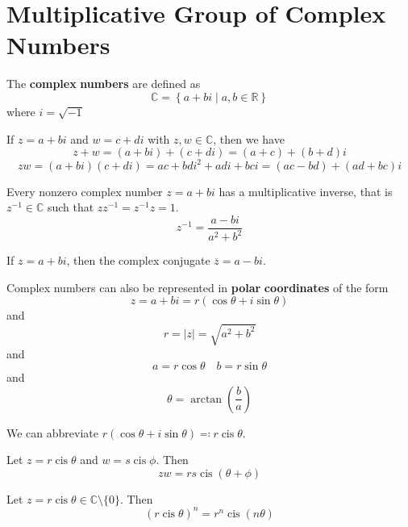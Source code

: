 \documentclass[12pt, letterpaper]{report}
\DeclareMathOperator{\cis}{cis}
\begin{document}
\section{Multiplicative Group of Complex Numbers}
\begin{definition}
	The \textbf{complex} \textbf{numbers} are defined as
	\[
		\mathbb{C} =\left\{ a+bi\mid a,b\in\mathbb{R}  \right\} 
	\]
	where \(i=\sqrt{-1} \)
\end{definition}
\begin{definition}
	If \(z=a+bi\) and \(w=c+di\) with \(z,w\in\mathbb{C} \), then we have 
	\[
		z+w=(a+bi)+(c+di)=(a+c)+(b+d)i
	\]
	\[zw=(a+bi)(c+di)=ac+bdi^2 +adi+bci =(ac-bd)+(ad+bc)i\]
\end{definition}
Every nonzero complex number \(z=a+bi\) has a multiplicative inverse, that is \(z^{-1} \in\mathbb{C} \) such that \(zz^{-1}=z^{-1} z=1\).
\[
	z^{-1} =\frac{a-bi}{a^2 +b^2}
\]
\begin{definition}
	If \(z=a+bi\), then the complex conjugate \(\overline{z}=a-bi\).
\end{definition}
Complex numbers can also be represented in \textbf{polar} \textbf{coordinates} of the form 
\[
	z=a+bi=r(\cos \theta +i\sin \theta )
\]
and
\[r=|z| =\sqrt{a^2 +b^2} \]
and
\[
	a=r\cos \theta \quad b=r\sin \theta 
\]
and
\[
	\theta =\arctan\left( \frac{b}{a} \right)
\]
\begin{notation}
	We can abbreviate \(r(\cos \theta +i\sin \theta )\eqqcolon r\cis \theta \).
\end{notation}
\begin{proposition}
	Let \(z=r\cis \theta \) and \(w=s\cis \phi \). Then
	\[
		zw=rs\cis(\theta +\phi )
	\]
\end{proposition}
\begin{theorem}[DeMoivre]
	Let \(z=r\cis \theta \in\mathbb{C} \setminus \{ 0 \} \). Then 
	\[
		\left( r\cis \theta  \right) ^n =r^n \cis(n \theta )
	\]
\end{theorem}
\end{document}
